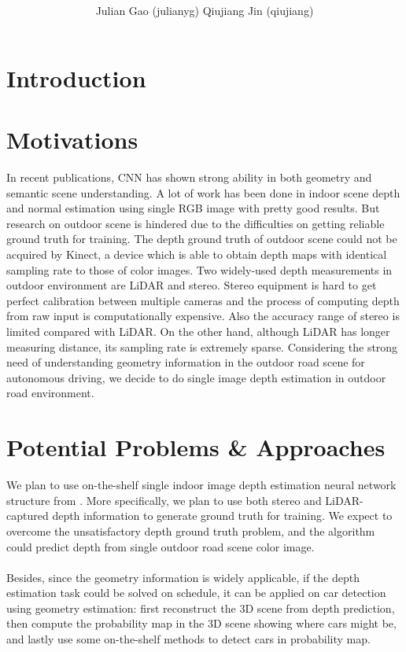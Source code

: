 \documentclass[a4paper]{article}
\title{ }
\author{Julian Gao (julianyg) Qiujiang Jin (qiujiang)}
\begin{document}
\maketitle


\section{Introduction}

\section{Motivations}
In recent publications, CNN has shown strong ability in both geometry and semantic scene understanding. A lot of work has been done in indoor scene depth and normal estimation using single RGB image with pretty good results\cite{laina2016deeper}\cite{li2015depth}\cite{hane2015direction}\cite{eigen2015predicting}. But research on outdoor scene is hindered due to the difficulties on getting reliable ground truth for training. The depth ground truth of outdoor scene could not be acquired by Kinect, a device which is able to obtain depth maps with identical sampling rate to those of color images. Two widely-used depth measurements in outdoor environment are LiDAR and stereo. Stereo equipment is hard to get perfect calibration between multiple cameras and the process of computing depth from raw input is computationally expensive. Also the accuracy range of stereo is limited compared with LiDAR. On the other hand, although LiDAR has longer measuring distance, its sampling rate is extremely sparse. Considering the strong need of understanding geometry information in the outdoor road scene for autonomous driving, we decide to do single image depth estimation in outdoor road environment. 

\section{Potential Problems \& Approaches}
We plan to use on-the-shelf single indoor image depth estimation neural network structure from \cite{eigen2015predicting}. More specifically, we plan to use both stereo and LiDAR-captured depth information to generate ground truth for training. We expect to overcome the unsatisfactory depth ground truth problem, and the algorithm could predict depth from single outdoor road scene color image.
\\\\
Besides, since the geometry information is widely applicable, if the depth estimation task could be solved on schedule, it can be applied on car detection using geometry estimation: first reconstruct the 3D scene from depth prediction, then compute the probability map in the 3D scene showing where cars might be, and lastly use some on-the-shelf methods to detect cars in probability map.
 
\end{document}

